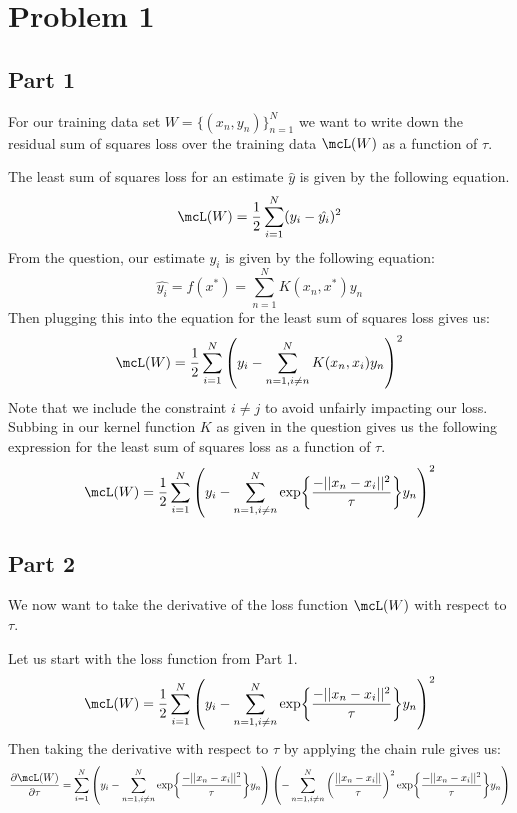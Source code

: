 \documentclass[submit]{harvardml}
\begin{document}
\newpage

\section{Problem 1}

\subsection{Part 1}

For our training data set $W = \{(x_n, y_n)\}^N_{n=1}$ we want to write down the residual sum of squares loss over the training data $\mcL(W)$ as a function of $\tau$.

The least sum of squares loss for an estimate $\hat{y}$ is given by the following equation.
\begin{equation*}
    \mcL(W) = \frac{1}{2} \sum_{i = 1}^N (y_i - \hat{y_i})^2
\end{equation*}
From the question, our estimate $\hat{y_i}$ is given by the following equation:
\begin{equation*}
    \hat{y_i} = f(x^*) = \sum_{n = 1}^N K(x_n, x^*)y_n
\end{equation*}
Then plugging this into the equation for the least sum of squares loss gives us:
\begin{equation*}
    \mcL(W) = \frac{1}{2} \sum_{i = 1}^N \left(y_i - \sum_{n=1, i \neq n}^N K(x_n, x_i)y_n\right)^2
\end{equation*}
Note that we include the constraint $i \neq j$ to avoid unfairly impacting our loss. Subbing in our kernel function $K$ as given in the question gives us the following expression for the least sum of squares loss as a function of $\tau$.
\begin{equation*}
    \mcL(W) = \frac{1}{2} \sum_{i=1}^N \left(y_i - \sum_{n=1, i \neq n}^N \exp{\frac{-||x_n - x_i||^2}{\tau}} y_n\right)^2
\end{equation*}

\subsection{Part 2}

We now want to take the derivative of the loss function $\mcL(W)$ with respect to $\tau$.

Let us start with the loss function from Part 1.
\begin{equation*}
    \mcL(W) = \frac{1}{2} \sum_{i=1}^N \left(y_i - \sum_{n=1, i \neq n}^N \exp{\frac{-||x_n - x_i||^2}{\tau}} y_n\right)^2
\end{equation*}
Then taking the derivative with respect to $\tau$ by applying the chain rule gives us:
\begin{equation*}
    \frac{\partial \mcL(W)}{\partial \tau} = \sum_{i=1}^N \left(y_i - \sum_{n=1,i\neq n}^N \exp{\frac{-||x_n - x_i||^2}{\tau}} y_n\right) \left( - \sum_{n=1,i\neq n}^N \left(\frac{||x_n - x_i||}{\tau}\right)^2 \exp{ \frac{-||x_n - x_i||^2}{\tau}} y_n \right)
\end{equation*}
\end{document}

